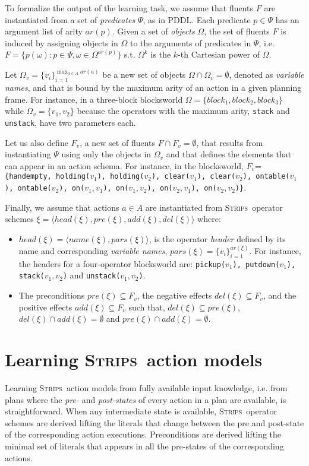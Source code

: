\documentclass{article}
\newcommand{\tup}[1]{{\langle #1 \rangle}}
\newcommand{\strips}{\textsc{Strips}}     %
\begin{document}
To formalize the output of the learning task, we assume that fluents $F$ are instantiated from a set of {\em predicates} $\Psi$, as in PDDL. Each predicate $p\in\Psi$ has an argument list of arity $ar(p)$. Given a set of {\em objects} $\Omega$, the set of fluents $F$ is induced by assigning objects in $\Omega$ to the arguments of predicates in $\Psi$, i.e.~$F=\{p(\omega):p\in\Psi,\omega\in\Omega^{ar(p)}\}$ s.t. $\Omega^k$ is the $k$-th Cartesian power of $\Omega$.

Let $\Omega_v=\{v_i\}_{i=1}^{\operatorname*{max}_{a\in A} ar(a)}$ be a new set of objects $\Omega\cap\Omega_v=\emptyset$, denoted as {\em variable names}, and that is bound by the maximum arity of an action in a given planning frame. For instance, in a three-block blocksworld $\Omega=\{block_1, block_2, block_3\}$ while $\Omega_v=\{v_1, v_2\}$ because the operators with the maximum arity, {\small\tt stack} and {\small\tt unstack}, have two parameters each.

Let us also define $F_v$, a new set of fluents $F\cap F_v=\emptyset$, that results from instantiating $\Psi$ using only the objects in $\Omega_v$ and that defines the elements that can appear in an action schema. For instance, in the blocksworld, $F_v$={\small\tt\{handempty, holding($v_1$), holding($v_2$), clear($v_1$), clear($v_2$), ontable($v_1$), ontable($v_2$), on($v_1,v_1$), on($v_1,v_2$), on($v_2,v_1$), on($v_2,v_2$)\}}.

Finally, we assume that actions $a\in A$ are instantiated from \strips\ operator schemes $\xi=\tup{head(\xi),pre(\xi),add(\xi),del(\xi)}$ where:
\begin{itemize}
\item $head(\xi)=\tup{name(\xi),pars(\xi)}$, is the operator {\em header} defined by its name and corresponding {\em variable names}, $pars(\xi)=\{v_i\}_{i=1}^{ar(\xi)}$. For instance, the headers for a four-operator blocksworld are: {\small\tt pickup($v_1$), putdown($v_1$), stack($v_1,v_2$)} and {\small\tt unstack($v_1,v_2$)}.
\item The preconditions $pre(\xi)\subseteq F_v$, the negative effects $del(\xi)\subseteq F_v$, and the positive effects $add(\xi)\subseteq F_v$ such that, $del(\xi)\subseteq pre(\xi)$, $del(\xi)\cap add(\xi)=\emptyset$ and $pre(\xi)\cap add(\xi)=\emptyset$.
\end{itemize}

\section{Learning \strips\ action models}
Learning \strips\ action models from fully available input knowledge, i.e. from plans where the {\em pre-} and {\em post-states} of every action in a plan are available, is straightforward. When any intermediate state is available, \strips\ operator schemes are derived lifting the literals that change between the pre and post-state of the corresponding action executions. Preconditions are derived lifting the minimal set of literals that appears in all the pre-states of the corresponding actions.
\end{document}
